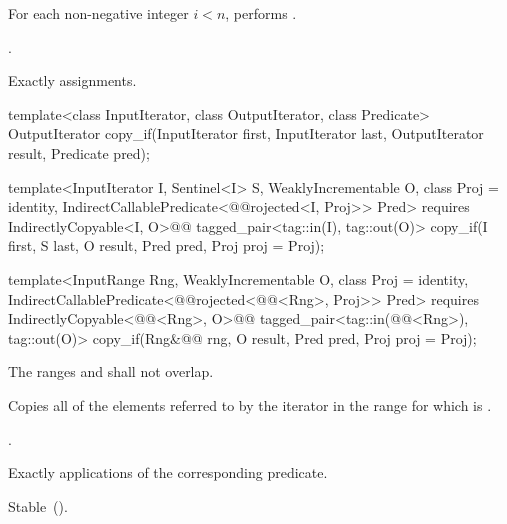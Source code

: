 \begin{itemdescr}
\pnum
\effects For each non-negative integer
$i < n$, performs .

\pnum
\returns {}.

\pnum
\complexity Exactly  assignments.
\end{itemdescr}

%
\begin{removedblock}
\begin{itemdecl}
template<class InputIterator, class OutputIterator, class Predicate>
  OutputIterator copy_if(InputIterator first, InputIterator last,
                         OutputIterator result, Predicate pred);
\end{itemdecl}
\end{removedblock}
\begin{addedblock}
\begin{itemdecl}
template<InputIterator I, Sentinel<I> S, WeaklyIncrementable O, class Proj = identity,
    IndirectCallablePredicate<@@rojected<I, Proj>> Pred>
  requires IndirectlyCopyable<I, O>@\newtxt{()}@
  tagged_pair<tag::in(I), tag::out(O)>
    copy_if(I first, S last, O result, Pred pred, Proj proj = Proj{});

template<InputRange Rng, WeaklyIncrementable O, class Proj = identity,
    IndirectCallablePredicate<@@rojected<@@<Rng>, Proj>> Pred>
  requires IndirectlyCopyable<@@<Rng>, O>@\newtxt{()}@
  tagged_pair<tag::in(@@<Rng>), tag::out(O)>
    copy_if(Rng&@\newtxt{\&}@ rng, O result, Pred pred, Proj proj = Proj{});
\end{itemdecl}
\end{addedblock}

\begin{itemdescr}
\pnum
\requires The ranges  and  shall not overlap.

\pnum
\effects Copies all of the elements referred to by the iterator  in the range 
for which  is .

\pnum
\returns {}.

\pnum
\complexity Exactly  applications of the corresponding predicate.

\pnum
\remarks Stable~().
\end{itemdescr}



